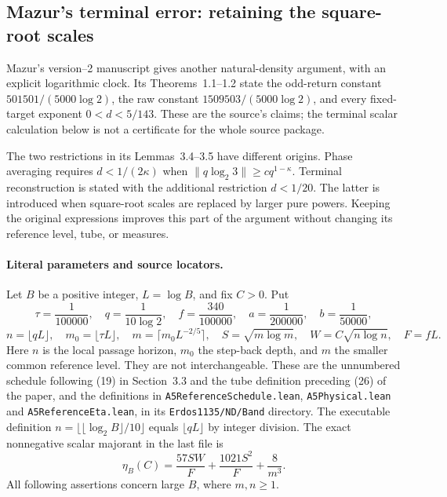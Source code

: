 \subsection{Mazur's terminal error: retaining the square-root scales}
\label{subsec:Mazur-terminal}

Mazur's version--2 manuscript \cite{Mazur2026v2} gives another
natural-density argument, with an explicit logarithmic clock. Its
Theorems~1.1--1.2 state the odd-return constant
$501501/(5000\log2)$, the raw constant $1509503/(5000\log2)$,
and every fixed-target exponent $0<d<5/143$. These are the source's
claims; the terminal scalar calculation below is not a certificate
for the whole source package.

The two restrictions in its Lemmas~3.4--3.5 have different origins.
Phase averaging requires $d<1/(2\kappa)$ when
$\|q\log_2 3\|\ge c q^{1-\kappa}$. Terminal reconstruction is
stated with the additional restriction $d<1/20$. The latter is
introduced when square-root scales are replaced by larger pure
powers. Keeping the original expressions improves this part of
the argument without changing its reference level, tube, or measures.

\paragraph{Literal parameters and source locators.}
Let $B$ be a positive integer, $L=\log B$, and fix $C>0$. Put
\[
 \tau=\frac1{100000},\quad q=\frac1{10\log2},\quad
 f=\frac{340}{100000},\quad
 a=\frac1{200000},\quad b=\frac1{50000},
\]
\[
 n=\lfloor qL\rfloor,\quad m_0=\lfloor\tau L\rfloor,\quad
 m=\lceil m_0L^{-2/5}\rceil,\quad
 S=\sqrt{m\log m},\quad W=C\sqrt{n\log n},\quad F=fL.
\]
Here $n$ is the local passage horizon, $m_0$ the step-back
depth, and $m$ the smaller common reference level. They are not
interchangeable. These are the unnumbered schedule following (19)
in Section~3.3 and the tube definition preceding (26) of the paper,
and the definitions in
\texttt{A5ReferenceSchedule.lean}, \texttt{A5Physical.lean}
and \texttt{A5ReferenceEta.lean}, in its
\texttt{Erdos1135/ND/Band} directory.
The executable definition $n=\lfloor\lfloor\log_2 B\rfloor/10\rfloor$
equals $\lfloor qL\rfloor$ by integer division.
The exact nonnegative scalar majorant in the last file is
\begin{equation}
 \eta_B(C)=\frac{57SW}{F}+\frac{1021S^2}{F}+\frac8{m^3}.
 \label{eq:Mazur-eta}
\end{equation}
All following assertions concern large $B$, where $m,n\ge1$.

